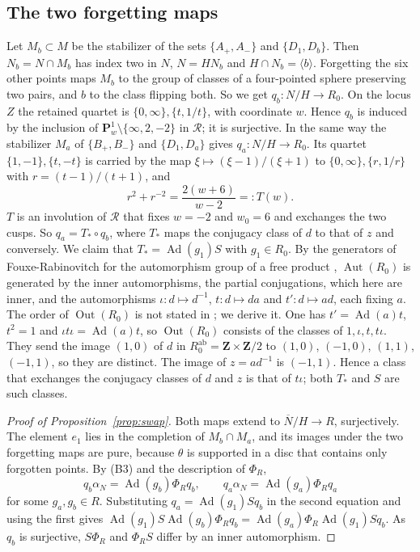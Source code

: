 \documentclass[11pt,a4paper]{article}
\theoremstyle{plain}
\theoremstyle{definition}
\theoremstyle{remark}
\newcommand{\Z}{\mathbf Z}
\newcommand{\Ad}{\operatorname{Ad}}
\newcommand{\Aut}{\operatorname{Aut}}
\newcommand{\Out}{\operatorname{Out}}
\newcommand{\ab}{\mathrm{ab}}
\begin{document}
\subsection*{The two forgetting maps}
Let $M_b\subset M$ be the stabilizer of the sets $\{A_+,A_-\}$ and $\{D_1,D_b\}$. Then $N_b=N\cap M_b$ has index two
in $N$, $N=HN_b$ and $H\cap N_b=\langle b\rangle$. Forgetting the six other points maps $M_b$ to the group of
classes of a four-pointed sphere preserving two pairs, and $b$ to the class flipping both. So we get
$q_b:N/H\to R_0$. On the locus $Z$ the retained quartet is $\{0,\infty\},\{t,1/t\}$, with coordinate $w$. Hence
$q_b$ is induced by the inclusion of $\mathbf P^1_w\setminus\{\infty,2,-2\}$ in $\mathcal R$; it is surjective.
In the same way the stabilizer $M_a$ of $\{B_+,B_-\}$ and $\{D_1,D_a\}$ gives $q_a:N/H\to R_0$. Its quartet
$\{1,-1\},\{t,-t\}$ is carried by the map $\xi\mapsto(\xi-1)/(\xi+1)$ to $\{0,\infty\},\{r,1/r\}$ with
$r=(t-1)/(t+1)$, and
\[
 r^2+r^{-2}=\frac{2(w+6)}{w-2}=:T(w).
\]
$T$ is an involution of $\mathcal R$ that fixes $w=-2$ and $w_0=6$ and exchanges the two cusps. So
$q_a=T_*\circ q_b$, where $T_*$ maps the conjugacy class of $d$ to that of $z$ and conversely. We claim
that $T_*=\Ad(g_1)S$ with $g_1\in R_0$. By the generators of Fouxe-Rabinovitch for the automorphism group of a
free product \cite{FR}, $\Aut(R_0)$ is generated by the inner automorphisms, the partial conjugations, which here
are inner, and the automorphisms $\iota:d\mapsto d^{-1}$, $t:d\mapsto da$ and $t':d\mapsto ad$, each fixing $a$.
The order of $\Out(R_0)$ is not stated in \cite{FR}; we derive it. One has $t'=\Ad(a)t$, $t^2=1$ and
$\iota t\iota=\Ad(a)t$, so $\Out(R_0)$ consists of the classes of $1,\iota,t,t\iota$. They send the image $(1,0)$
of $d$ in $R_0^{\ab}=\Z\times\Z/2$ to $(1,0)$, $(-1,0)$, $(1,1)$, $(-1,1)$, so they are distinct. The image of
$z=ad^{-1}$ is $(-1,1)$. Hence a class that exchanges the conjugacy classes of $d$ and $z$ is that of $t\iota$;
both $T_*$ and $S$ are such classes.

\begin{proof}[Proof of Proposition~\ref{prop:swap}]
Both maps extend to $\overline N/H\to R$, surjectively. The element $e_1$ lies in the completion of $M_b\cap M_a$,
and its images under the two forgetting maps are pure, because $\theta$ is supported in a disc that contains only
forgotten points. By (B3) and the description of $\Phi_R$,
\[
 q_b\alpha_N=\Ad(g_b)\Phi_Rq_b,\qquad q_a\alpha_N=\Ad(g_a)\Phi_Rq_a
\]
for some $g_a,g_b\in R$. Substituting $q_a=\Ad(g_1)Sq_b$ in the second equation and using the first gives
$\Ad(g_1)S\Ad(g_b)\Phi_Rq_b=\Ad(g_a)\Phi_R\Ad(g_1)Sq_b$. As $q_b$ is surjective, $S\Phi_R$ and $\Phi_RS$ differ by
an inner automorphism.
\end{proof}
\end{document}
